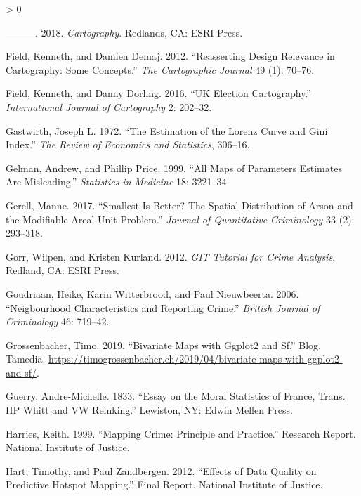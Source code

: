 \documentclass[
  krantz2]{krantz}
\newlength{\cslhangindent}
\newenvironment{CSLReferences}[2] %
 {%
  \setlength{\parindent}{0pt}
  \ifodd #1 \everypar{\setlength{\hangindent}{\cslhangindent}}\ignorespaces\fi
  \ifnum #2 > 0
  \setlength{\parskip}{#2\baselineskip}
  \fi
 }%
 {}
\begin{document}
\begin{CSLReferences}{1}{0}
\leavevmode\hypertarget{ref-Field_2018}{}%
---------. 2018. \emph{Cartography}. Redlands, CA: ESRI Press.

\leavevmode\hypertarget{ref-Field_2012}{}%
Field, Kenneth, and Damien Demaj. 2012. {``Reasserting Design Relevance in Cartography: Some Concepts.''} \emph{The Cartographic Journal} 49 (1): 70--76.

\leavevmode\hypertarget{ref-Field_2016}{}%
Field, Kenneth, and Danny Dorling. 2016. {``UK Election Cartography.''} \emph{International Journal of Cartography} 2: 202--32.

\leavevmode\hypertarget{ref-gastwirth1972estimation}{}%
Gastwirth, Joseph L. 1972. {``The Estimation of the Lorenz Curve and Gini Index.''} \emph{The Review of Economics and Statistics}, 306--16.

\leavevmode\hypertarget{ref-Gelman_1999}{}%
Gelman, Andrew, and Phillip Price. 1999. {``All Maps of Parameters Estimates Are Misleading.''} \emph{Statistics in Medicine} 18: 3221--34.

\leavevmode\hypertarget{ref-Gerell_2017}{}%
Gerell, Manne. 2017. {``Smallest Is Better? The Spatial Distribution of Arson and the Modifiable Areal Unit Problem.''} \emph{Journal of Quantitative Criminology} 33 (2): 293--318.

\leavevmode\hypertarget{ref-Gorr_2012}{}%
Gorr, Wilpen, and Kristen Kurland. 2012. \emph{GIT Tutorial for Crime Analysis}. Redland, CA: ESRI Press.

\leavevmode\hypertarget{ref-Goudriaan_2006}{}%
Goudriaan, Heike, Karin Witterbrood, and Paul Nieuwbeerta. 2006. {``Neigbourhood Characteristics and Reporting Crime.''} \emph{British Journal of Criminology} 46: 719--42.

\leavevmode\hypertarget{ref-Grossenbacher_2019}{}%
Grossenbacher, Timo. 2019. {``Bivariate Maps with Ggplot2 and Sf.''} Blog. Tamedia. \url{https://timogrossenbacher.ch/2019/04/bivariate-maps-with-ggplot2-and-sf/}.

\leavevmode\hypertarget{ref-Guerry_1833}{}%
Guerry, Andre-Michelle. 1833. {``Essay on the Moral Statistics of France, Trans. HP Whitt and VW Reinking.''} Lewiston, NY: Edwin Mellen Press.

\leavevmode\hypertarget{ref-Harries_1999}{}%
Harries, Keith. 1999. {``Mapping Crime: Principle and Practice.''} Research Report. National Institute of Justice.

\leavevmode\hypertarget{ref-Hart_2012}{}%
Hart, Timothy, and Paul Zandbergen. 2012. {``Effects of Data Quality on Predictive Hotspot Mapping.''} Final Report. National Institute of Justice.


\end{CSLReferences}
\end{document}
